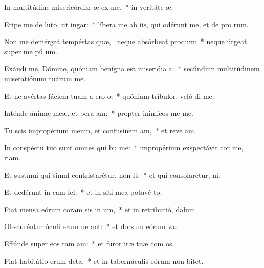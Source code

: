 \item In multitúdine misericórdiæ æ ex me,~* in veritáte  æ:
\item Eripe me de luto, ut  ingar:~* líbera me ab iis, qui odérunt me, et de pro rum.
\item Non me demérgat tempéstas quæ,~\pscross{} neque absórbeat  produm:~* neque úrgeat super me pú  um.
\item Exáudi me, Dómine, quóniam benígna est miseridia a:~* secúndum multitúdinem miseratiónum tuárum   me.
\item Et ne avértas fáciem tuam a ero o:~* quóniam tríbulor, veló di me.
\item Inténde ánimæ meæ, et bera am:~* propter inimícos me  me.
\item Tu scis impropérium meum, et confusinem am,~* et reve am.
\item In conspéctu tuo sunt omnes qui bu me:~* impropérium exspectávit cor me,  riam.
\item Et sustínui qui simul contristarétur,  non it:~* et qui consolarétur,   ni.
\item Et dedérunt in cam  fel:~* et in siti mea potavé  to.
\item Fiat mensa eórum coram sis in um,~* et in retributió,   dalum.
\item Obscuréntur óculi erum ne ant:~* et dorsum eórum  va.
\item Effúnde super eos ram am:~* et furor iræ tuæ com os.
\item Fiat habitátio erum deta:~* et in tabernáculis eórum non   bitet.

